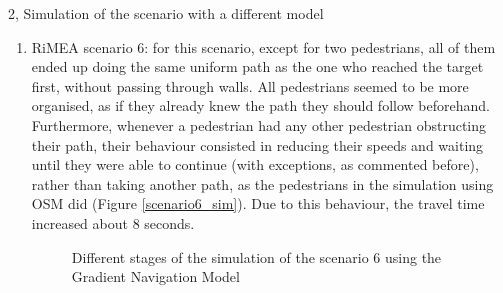 \documentclass[10pt,a4paper]{article}
\begin{document}
\begin{task}{2, Simulation of the scenario with a different model}
\begin{enumerate}[label=(\alph*)]
    \item RiMEA scenario 6: for this scenario, except for two pedestrians, all of them ended up doing the same uniform path as the one who reached the target first, without passing through walls. All pedestrians seemed to be more organised, as if they already knew the path they should follow beforehand. Furthermore, whenever a pedestrian had any other pedestrian obstructing their path, their behaviour consisted in reducing their speeds and waiting until they were able to continue (with exceptions, as commented before), rather than taking another path, as the pedestrians in the simulation using OSM did (Figure \ref{scenario6_sim}). Due to this behaviour, the travel time increased about 8 seconds.
    
    \begin{figure} [H]
    \centering
        \caption{Different stages of the simulation of the scenario 6 using the Gradient Navigation Model}
        \label{scenario6_gnm}
    \end{figure}
    

\end{enumerate}
\end{task}
\end{document}
